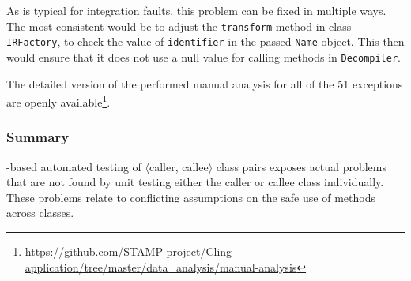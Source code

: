 %

As is typical for integration faults, this problem can be fixed in multiple ways. The most consistent would be to adjust the \texttt{transform} method in class \texttt{IRFactory}, to check the value of \texttt{identifier} in the passed \texttt{Name} object. This then would ensure that it does not use a null value for calling methods in \texttt{Decompiler}.


The detailed version of the performed manual analysis for all of the 51 exceptions are openly available\footnote{\url{https://github.com/STAMP-project/Cling-application/tree/master/data\_analysis/manual-analysis}}.

\subsubsection{Summary}
\integration-based automated testing of $\langle$caller, callee$\rangle$ class pairs exposes actual problems that are not found by unit testing either the caller or callee class individually. These problems relate to conflicting assumptions on the safe use of methods across classes.